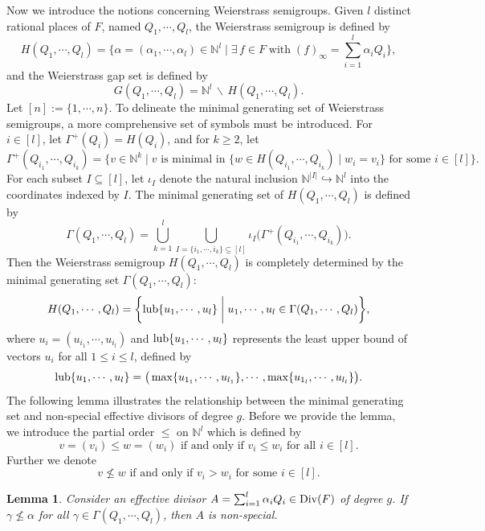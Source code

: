\documentclass[journal,12pt,onecolumn]{IEEEtran}
\newtheorem{lemma}[theorem]{Lemma}
\begin{document}
Now we introduce the notions concerning Weierstrass semigroups. Given $l$ distinct rational places of $F$, named $Q_1,\cdots,Q_l$, the Weierstrass semigroup is defined by
\[
    H(Q_1,\cdots,Q_l)=\bigg\{\alpha=(\alpha_1,\cdots,\alpha_l)\in\mathbb{N}^l\;\bigg| \;\exists\, f\in F\;\text{with}\;(f)_\infty=\sum_{i=1}^l\alpha_iQ_i\bigg\},
\]
and the Weierstrass gap set is defined by 
\[
    G(Q_1,\cdots,Q_l)=\mathbb{N}^l\,\backslash \,H(Q_1,\cdots,Q_l).
\]
Let $[n]:=\{1,\cdots,n\}$. To delineate the minimal generating set of Weierstrass semigroups, a more comprehensive set of symbols must be introduced. For $i\in[l]$, let $\Gamma^+(Q_i)=H(Q_i)$, and for $k\ge2$, let
\[
    \Gamma^+(Q_{i_1},\cdots,Q_{i_k})=\bigg\{ v\in\mathbb{N}^k\;\bigg|\;v\text{ is minimal in }\{w\in H(Q_{i_1},\cdots,Q_{i_k})\mid w_i=v_i\}\text{ for some }i\in[l]\bigg\}.
\]
For each subset $I\subseteq[l]$, let $\iota_I$ denote the natural inclusion $\mathbb{N}^{|I|}\hookrightarrow \mathbb{N}^l$ into the coordinates indexed by $I$. The minimal generating set of $H(Q_1,\cdots,Q_l)$ is defined by
\[
    \Gamma(Q_1,\cdots,Q_l)=\bigcup_{k=1}^l\bigcup_{I=\{i_1,\cdots,i_k\}\subseteq[l]}\iota_I\big(\Gamma^+(Q_{i_1},\cdots,Q_{i_k})\big). 
\]
Then the Weierstrass semigroup $H(Q_1,\cdots,Q_l)$ is completely determined by the minimal generating set $\Gamma(Q_1,\cdots,Q_l)$\cite[Thm. 7]{The_Weierstrass_Semigroup_of_an_m-tuple_of_Collinear_Points_on_a_Hermitian_Curve}:
\[
    H(Q_1,\cdots,Q_l) = \bigg\{ {\rm lub}\{u_1,\cdots,u_l\}\;\bigg|\;u_1,\cdots,u_l\in \Gamma(Q_1,\cdots,Q_l) \bigg\},
\]
where $u_i = (u_{i_1},\cdots,u_{i_l})$ and ${\rm lub}\{u_1,\cdots,u_l\}$ represents the least upper bound of vectors $u_i$ for all $1\le i\le l$, defined by
\[
    {\rm lub}\{u_1,\cdots,u_l\}=\big(\max\{u_{1_1},\cdots,u_{l_1}\},\cdots,\max\{u_{1_l},\cdots,u_{l_l}\}\big).
\]
The following lemma illustrates the relationship between the minimal generating set and non-special effective divisors of degree $g$. Before we provide the lemma, we introduce the partial order $\le$ on $\mathbb{N}^l$ which is defined by
\[
    v=(v_i)\le w=(w_i) \text{ if and only if } v_i\le w_i \text{ for all } i\in [l].
\]
Further we denote
\[
    v\nleq w \text{ if and only if } v_i> w_i \text{ for some } i\in [l].
\]
\begin{lemma}\cite[Prop. 5]{Explicit_Non-special_Divisors_of_Small_Degree}\label{non-special}
    Consider an effective divisor $A=\sum_{i=1}^l\alpha_iQ_i\in {\rm Div}(F)$ of degree $g$. If $\gamma\nleq \alpha$ for all $\gamma\in\Gamma(Q_1,\cdots,Q_l)$, then $A$ is non-special.
\end{lemma}
\end{document}
